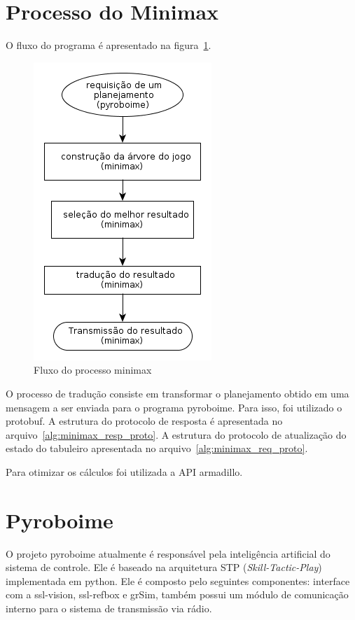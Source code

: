 \section{Processo do Minimax}\label{sec:minimax}

O fluxo do programa é apresentado na figura~\ref{fig:minimax_flow}.

\begin{figure}
  \centering
  \includegraphics[width=0.2 \linewidth]{img/minimax_flow}
  \caption{Fluxo do processo minimax}\label{fig:minimax_flow}
\end{figure}

O processo de tradução consiste em transformar o planejamento obtido em uma
mensagem a ser enviada para o programa pyroboime. Para isso, foi utilizado
o protobuf. A estrutura do protocolo de resposta é apresentada no
arquivo~\ref{alg:minimax_resp_proto}. A estrutura do protocolo de atualização do
estado do tabuleiro apresentada no arquivo~\ref{alg:minimax_req_proto}.

Para otimizar os cálculos foi utilizada a API armadillo.





\section{Pyroboime}\label{sec:pyroboime}

O projeto pyroboime atualmente é responsável pela inteligência artificial do
sistema de controle. Ele é baseado na arquitetura STP
(\textit{Skill-Tactic-Play}) implementada em python.
Ele é composto pelo seguintes componentes: interface com a ssl-vision,
ssl-refbox e grSim, também possui um módulo de comunicação interno para o
sistema de transmissão via rádio.

